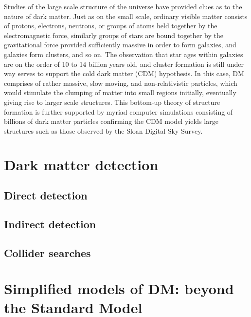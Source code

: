 Studies of the large scale structure of the universe have provided clues as to the nature of dark matter. Just as on the small scale, ordinary visible matter consists of protons, electrons, neutrons, or groups of atoms held together by the electromagnetic force, similarly groups of stars are bound together by the gravitational force provided sufficiently massive in order to form galaxies, and galaxies form clusters, and so on. The observation that star ages within galaxies are on the order of 10 to 14 billion years old, and cluster formation is still under way serves to support the cold dark matter (CDM) hypothesis. In this case, DM comprises of rather massive, slow moving, and non-relativistic particles, which would stimulate the clumping of matter into small regions initially, eventually giving rise to larger scale structures. This bottom-up theory of structure formation is further supported by myriad computer simulations consisting of billions of dark matter particles confirming the CDM model yields large structures such as those observed by the Sloan Digital Sky Survey. 

\section{Dark matter detection}
\label{sec:DMsearches}

\subsection{Direct detection}

\subsection{Indirect detection}

\subsection{Collider searches}

\section{Simplified models of DM: beyond the Standard Model}
\label{sec:SM}


